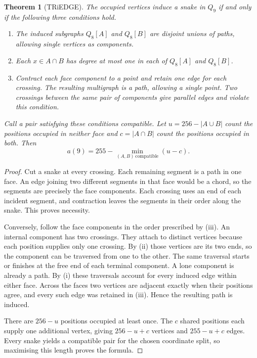 \documentclass[11pt,a4paper]{article}
\newtheorem{theorem}{Theorem}[section]
\theoremstyle{definition}
\theoremstyle{remark}
\newcommand{\Q}{Q}
\begin{document}
\begin{theorem}[TRiEDGE]\label{thm:triedge}
The occupied vertices induce a snake in $\Q_9$ if and only if the following
three conditions hold.
\begin{enumerate}[label=\textup{(\roman*)}]
\item The induced subgraphs $\Q_8[A]$ and $\Q_8[B]$ are disjoint unions
of paths, allowing single vertices as components.
\item Each $x\in A\cap B$ has degree at most one in each of
$\Q_8[A]$ and $\Q_8[B]$.
\item Contract each face component to a point and retain one edge for
each crossing. The resulting multigraph is a path, allowing a single
point. Two crossings between the same pair of components give parallel
edges and violate this condition.
\end{enumerate}
Call a pair satisfying these conditions compatible. Let
$u=256-|A\cup B|$ count the positions occupied in neither face and
$c=|A\cap B|$ count the positions occupied in both. Then
\[
  \boxed{\displaystyle a(9)=255-\min_{(A,B)\ \mathrm{compatible}}(u-c).}
\]
\end{theorem}
\begin{proof}
Cut a snake at every crossing. Each remaining segment is a path in one
face. An edge joining two different segments in that face would be a
chord, so the segments are precisely the face components. Each crossing
uses an end of each incident segment, and contraction leaves the segments
in their order along the snake. This proves necessity.

Conversely, follow the face components in the order prescribed by
\textup{(iii)}. An internal component has two crossings. They attach to
distinct vertices because each position supplies only one crossing.
By \textup{(ii)} those vertices are its two ends, so the component can
be traversed from one to the other. The same traversal starts or finishes
at the free end of each terminal component. A lone component is already
a path. By \textup{(i)} these traversals account for every induced edge
within either face. Across the faces two vertices are adjacent exactly
when their positions agree, and every such edge was retained in
\textup{(iii)}. Hence the resulting path is induced.

There are $256-u$ positions occupied at least once. The $c$ shared
positions each supply one additional vertex, giving $256-u+c$ vertices
and $255-u+c$ edges. Every snake yields a compatible pair for the chosen
coordinate split, so maximising this length proves the formula.
\end{proof}
\end{document}
